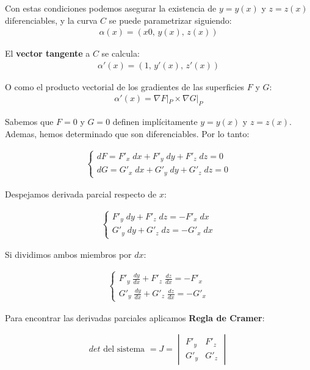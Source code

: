 Con estas condiciones podemos asegurar la existencia de
\(y = y(x)\) y \(z = z(x)\) diferenciables,
y la curva \(C\) se puede parametrizar siguiendo:
\begin{align*}
    \alpha(x) = (x0, \,y(x), \,z(x))
\end{align*}

El \textbf{vector tangente} a \(C\) se calcula:
\begin{align*}
    \alpha'(x) = (1, \,y'(x), \,z'(x))
\end{align*}

O como el producto vectorial de los gradientes de las superficies \(F\) y \(G\):
\begin{align*}
    \alpha'(x) = \nabla F|_P \times \nabla G|_P
\end{align*}

Sabemos que \(F = 0\) y \(G = 0\)
definen implícitamente \(y = y(x)\) y \(z = z(x)\).
Ademas, hemos determinado que son diferenciables.
Por lo tanto:

\begin{align*}
    \begin{cases}
        dF = F'_x \; dx + F'_y \; dy + F'_z \; dz = 0 \\
        dG = G'_x \; dx + G'_y \; dy + G'_z \; dz = 0
    \end{cases}
\end{align*}

Despejamos derivada parcial respecto de \(x\):

\begin{align*}
    \begin{cases}
        F'_y \; dy + F'_z \; dz = -F'_x \; dx \\
        G'_y \; dy + G'_z \; dz = -G'_x \; dx
    \end{cases}
\end{align*}

Si dividimos ambos miembros por \(dx\):

\begin{align*}
    \begin{cases}
        F'_y \; \frac{dy}{dx} + F'_z \; \frac{dz}{dx} = -F'_x \\
        G'_y \; \frac{dy}{dx} + G'_z \; \frac{dz}{dx} = -G'_x
    \end{cases}
\end{align*}

Para encontrar las derivadas parciales aplicamos \textbf{Regla de Cramer}:

\begin{align*}
    det \text{ del sistema } = J = \begin{vmatrix}
                                       F'_y & F'_z \\
                                       G'_y & G'_z
                                   \end{vmatrix}
\end{align*}

